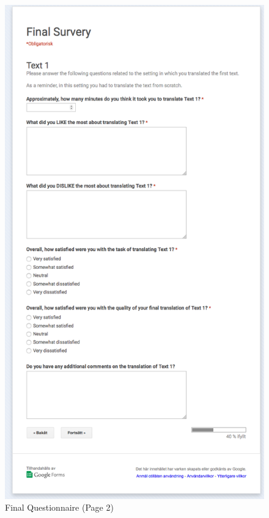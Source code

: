 \begin{figure}[h]
\myfloatalign
\includegraphics[height=\textheight]{img/final_questionnaire/final_2.png}
\caption{Final Questionnaire (Page 2)}
\end{figure}

